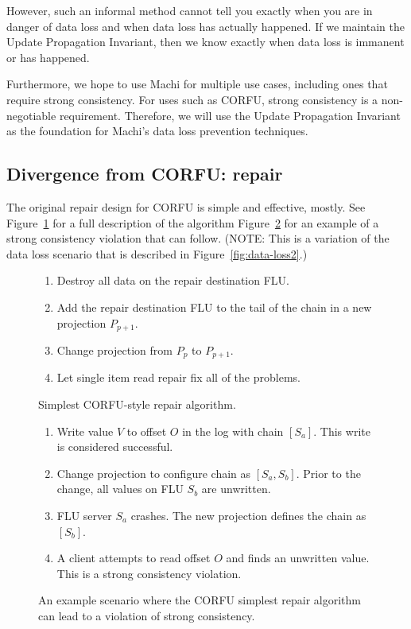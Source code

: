\documentclass[preprint,10pt]{sigplanconf}
\begin{document}
However, such an informal method
cannot tell you exactly when you are in danger of data loss and when
data loss has actually happened.  If we maintain the Update
Propagation Invariant, then we know exactly when data loss is immanent
or has happened.

Furthermore, we hope to use Machi for multiple use cases, including
ones that require strong consistency.
For uses such as CORFU, strong consistency is a non-negotiable
requirement.  Therefore, we will use the Update Propagation Invariant
as the foundation for Machi's data loss prevention techniques.

\subsection{Divergence from CORFU: repair}
\label{sub:repair-divergence}

The original repair design for CORFU is simple and effective,
mostly.  See Figure~\ref{fig:corfu-style-repair} for a full
description of the algorithm
Figure~\ref{fig:corfu-repair-sc-violation} for an example of a strong
consistency violation that can follow.  (NOTE: This is a variation of
the data loss scenario that is described in
Figure~\ref{fig:data-loss2}.)

\begin{figure}
\begin{enumerate}
\item Destroy all data on the repair destination FLU.
\item Add the repair destination FLU to the tail of the chain in a new
  projection $P_{p+1}$.
\item Change projection from $P_p$ to $P_{p+1}$.
\item Let single item read repair fix all of the problems.
\end{enumerate}
\caption{Simplest CORFU-style repair algorithm.}
\label{fig:corfu-style-repair}
\end{figure}

\begin{figure}
\begin{enumerate}
\item Write value $V$ to offset $O$ in the log with chain $[S_a]$.
  This write is considered successful.
\item Change projection to configure chain as $[S_a,S_b]$.  Prior to
  the change, all values on FLU $S_b$ are unwritten.
\item FLU server $S_a$ crashes.  The new projection defines the chain
  as $[S_b]$.
\item A client attempts to read offset $O$ and finds an unwritten
  value.  This is a strong consistency violation.
\end{enumerate}
\caption{An example scenario where the CORFU simplest repair algorithm
  can lead to a violation of strong consistency.}
\label{fig:corfu-repair-sc-violation}
\end{figure}
\end{document}
